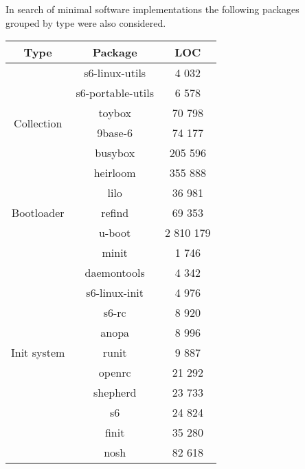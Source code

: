 In search of minimal software implementations the following packages\\ grouped by type were also considered.

\begin{table}[!ht]
    \centering
    \begin{tabular}{|c|c|c|}
        \hline
        Type & Package & LOC \\
        \hline
        \hline
        \multirow{6}{*}{Collection}
        & s6-linux-utils \cite{s6-linux} & 4 032 \\
        \cline{2-3}
        & s6-portable-utils \cite{s6-portable} & 6 578 \\
        \cline{2-3}
        & toybox \cite{toybox} & 70 798 \\
        \cline{2-3}
        & 9base-6 \cite{9base} & 74 177 \\
        \cline{2-3}
        & busybox \cite{busybox} & 205 596 \\
        \cline{2-3}
        & heirloom \cite{heirloom} \footnotemark & 355 888 \\
        \hline
        \hline
        \multirow{3}{*}{Bootloader}
        & lilo \cite{lilo} & 36 981 \\
        \cline{2-3}
        & refind \cite{refind} & 69 353 \\
        \cline{2-3}
        & u-boot \cite{uboot} & 2 810 179 \\
        \hline
        \hline
        \multirow{11}{*}{Init system}
        & minit \cite{minit} & 1 746 \\
        \cline{2-3}
        & daemontools \cite{daemontools} & 4 342 \\
        \cline{2-3}
        & s6-linux-init \cite{s6-linux-init} & 4 976 \\
        \cline{2-3}
        & s6-rc \cite{s6-rc} & 8 920 \\
        \cline{2-3}
        & anopa \cite{anopa} & 8 996 \\
        \cline{2-3}
        & runit \cite{runit} & 9 887 \\
        \cline{2-3}
        & openrc \cite{openrc} & 21 292 \\
        \cline{2-3}
        & shepherd \cite{shepherd} & 23 733 \\
        \cline{2-3}
        & s6 \cite{s6} & 24 824 \\
        \cline{2-3}
        & finit \cite{finit} & 35 280 \\
        \cline{2-3}
        & nosh \cite{nosh} & 82 618 \\

\end{tabular}
\end{table}
